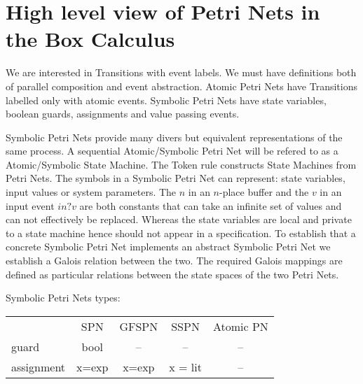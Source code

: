 
\section{High level view of Petri Nets in the Box Calculus}
We  are interested in Transitions with event labels. We must have  definitions both of parallel composition and event abstraction. Atomic Petri Nets have Transitions labelled only with atomic events.  Symbolic Petri Nets have state variables, boolean guards, assignments and value passing events.


Symbolic Petri Nets provide many divers but equivalent representations of the same process.  A sequential Atomic/Symbolic Petri Net will be refered to as a Atomic/Symbolic  State Machine. The Token rule constructs State Machines from Petri Nets.
The symbols in a Symbolic Petri Net can represent: state variables, input values or system parameters. The $n$ in an $n$-place buffer and the $v$ in an input event $in?v$ are both constants that can take an infinite set of values and can not effectively be replaced. Whereas the state variables are local and private to a state machine hence should not appear in a specification. To establish that a concrete Symbolic Petri Net implements an abstract Symbolic Petri Net we establish a Galois relation between the two. The required Galois mappings  are defined as particular relations between the state spaces of the two Petri Nets.




Symbolic Petri Nets types:
\begin{center}
\begin{tabular}{lcccc}
& SPN & GFSPN & SSPN  & Atomic PN\\
guard & bool& \hspace{2em} -- \hspace{2em} & \hspace{2em} -- \hspace{2em} & \hspace{2em} -- \hspace{2em} \\
assignment \hspace{2em}& x=exp & x=exp & x = lit & \hspace{2em} -- \hspace{2em}\\
\end{tabular}
\end{center}

